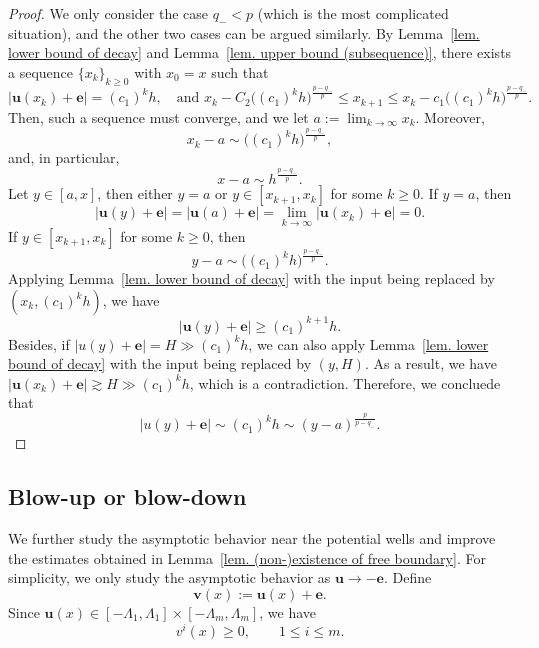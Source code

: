 \documentclass[11pt,twoside,reqno]{amsart}
\numberwithin{equation}{section}
\begin{document}
\begin{proof}
    We only consider the case $q_{-}<p$ (which is the most complicated situation), and the other two cases can be argued similarly. By Lemma~\ref{lem. lower bound of decay} and Lemma~\ref{lem. upper bound (subsequence)}, there exists a sequence $\{x_k\}_{k\geq0}$ with $x_0=x$ such that
    \begin{equation*}
        |\mathbf{u}(x_{k})+\mathbf{e}|=(c_{1})^{k}h,\quad\mbox{and }x_{k}-C_{2}\Big((c_{1})^{k}h\Big)^{\frac{p-q_{-}}{p}}\leq x_{k+1}\leq x_{k}-c_{1}\Big((c_{1})^{k}h\Big)^{\frac{p-q_{-}}{p}}.
    \end{equation*}
    Then, such a sequence must converge, and we let $\displaystyle a:=\lim_{k\to\infty}x_{k}$. Moreover,
    \begin{equation*}
        x_{k}-a\sim\Big((c_{1})^{k}h\Big)^{\frac{p-q_{-}}{p}},
    \end{equation*}
    and, in particular,
\[
x-a\sim h^{\frac{p-q_-}{p}} .
\]
    Let $y\in[a,x]$, then either $y=a$ or $y\in[x_{k+1},x_{k}]$ for some $k\geq0$. If $y=a$, then
    \begin{equation*}
        |\mathbf{u}(y)+\mathbf{e}|=|\mathbf{u}(a)+\mathbf{e}|=\lim_{k\to\infty}|\mathbf{u}(x_{k})+\mathbf{e}|=0.
    \end{equation*}
    If $y\in[x_{k+1},x_{k}]$ for some $k\geq0$, then 
    $$y-a\sim\Big((c_{1})^{k}h\Big)^{\frac{p-q_{-}}{p}}.$$ 
    Applying Lemma~\ref{lem. lower bound of decay} with the input being replaced by $(x_{k},(c_{1})^{k}h)$, we have $$|\mathbf{u}(y)+\mathbf{e}|\geq(c_{1})^{k+1}h. $$
    Besides, if $|u(y)+\mathbf{e}|=H\gg(c_{1})^{k}h$, we can also apply Lemma~\ref{lem. lower bound of decay} with the input being replaced by $(y,H)$. As a result, we have $|\mathbf{u}(x_{k})+\mathbf{e}|\gtrsim H\gg(c_{1})^{k}h$, which is a contradiction. Therefore, we concluede that $$|u(y)+\mathbf{e}|\sim(c_{1})^{k}h\sim(y-a)^{\frac{p}{p-q_{-}}}.$$
\end{proof}
\subsection{Blow-up or blow-down}\label{subsec. Blow-up or blow-down}
We further study the asymptotic behavior near the potential wells and improve the estimates obtained in Lemma~\ref{lem. (non-)existence of free boundary}. For simplicity, we only study the asymptotic behavior as $\mathbf{u}\to-\mathbf{e}$. Define
\begin{equation*}
    \mathbf{v}(x):=\mathbf{u}(x)+\mathbf{e}.
\end{equation*}
Since $\mathbf{u}(x)\in[-\Lambda_{1},\Lambda_{1}]\times[-\Lambda_{m},\Lambda_{m}]$, we have 
\[
v^{i}(x)\geq0,\qquad 1\leq i\leq m.
\]
\end{document}
